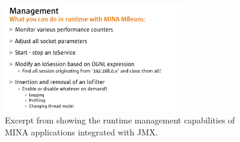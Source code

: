 \begin{figure}[H]
    \centering
    \includegraphics[width=0.7\textwidth]{images/management.png}
    \caption{Excerpt from \cite{mina-talk2008} showing the runtime management capabilities of MINA applications integrated with JMX.}
    \label{fig:manageability}
\end{figure}

